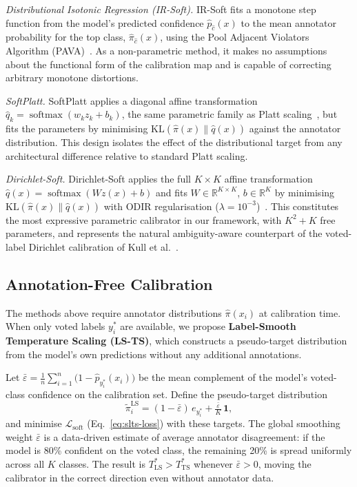 \documentclass[10pt,journal,compsoc]{IEEEtran}
\newcommand{\pihat}{\hat{\pi}}
\newcommand{\tpihat}{\tilde{\pi}}
\newcommand{\bR}{\mathbb{R}}
\newcommand{\KL}{\mathrm{KL}}
\begin{document}
\noindent\textit{Distributional Isotonic Regression (IR-Soft).}
IR-Soft fits a monotone step function from the model's predicted confidence $\hat{p}_{\hat{c}}(x)$ to the mean annotator probability for the top class, $\pihat_{\hat{c}}(x)$, using the Pool Adjacent Violators Algorithm (PAVA)~\cite{zadrozny2002transforming}.  As a non-parametric method, it makes no assumptions about the functional form of the calibration map and is capable of correcting arbitrary monotone distortions.

\noindent\textit{SoftPlatt.}
SoftPlatt applies a diagonal affine transformation $\hat{q}_k=\operatorname{softmax}(w_k z_k + b_k)$, the same parametric family as Platt scaling~\cite{platt1999probabilistic}, but fits the parameters by minimising $\KL(\pihat(x)\|\hat{q}(x))$ against the annotator distribution.  This design isolates the effect of the distributional target from any architectural difference relative to standard Platt scaling.

\noindent\textit{Dirichlet-Soft.}
Dirichlet-Soft applies the full $K\!\times\!K$ affine transformation $\hat{q}(x)=\operatorname{softmax}(Wz(x)+b)$ and fits $W\in\bR^{K\times K}$, $b\in\bR^K$ by minimising $\KL(\pihat(x)\|\hat{q}(x))$ with ODIR regularisation ($\lambda=10^{-3}$)~\cite{kull2019beyond}.  This constitutes the most expressive parametric calibrator in our framework, with $K^2+K$ free parameters, and represents the natural ambiguity-aware counterpart of the voted-label Dirichlet calibration of Kull et al.~\cite{kull2019beyond}.

\subsection{Annotation-Free Calibration}
\label{sec:annotation-free}

The methods above require annotator distributions $\pihat(x_i)$ at calibration time.
When only voted labels $y^*_i$ are available, we propose \textbf{Label-Smooth Temperature Scaling (LS-TS)}, which constructs a pseudo-target distribution from the model's own predictions without any additional annotations.

Let $\bar\varepsilon = \frac{1}{n}\sum_{i=1}^n \bigl(1 - \hat p_{y^*_i}(x_i)\bigr)$ be the mean complement of the model's voted-class confidence on the calibration set.
Define the pseudo-target distribution
\begin{equation}
  \tpihat^{\mathrm{LS}}_i
  = (1-\bar\varepsilon)\,e_{y^*_i} + \tfrac{\bar\varepsilon}{K}\,\mathbf{1},
  \label{eq:lsts}
\end{equation}
and minimise $\mathcal{L}_{\mathrm{soft}}$ (Eq.~\ref{eq:slts-loss}) with these targets.
The global smoothing weight $\bar\varepsilon$ is a data-driven estimate of average annotator disagreement: if the model is 80\% confident on the voted class, the remaining 20\% is spread uniformly across all $K$ classes.  The result is $T^*_{\mathrm{LS}} > T^*_{\mathrm{TS}}$ whenever $\bar\varepsilon > 0$, moving the calibrator in the correct direction even without annotator data.
\end{document}
